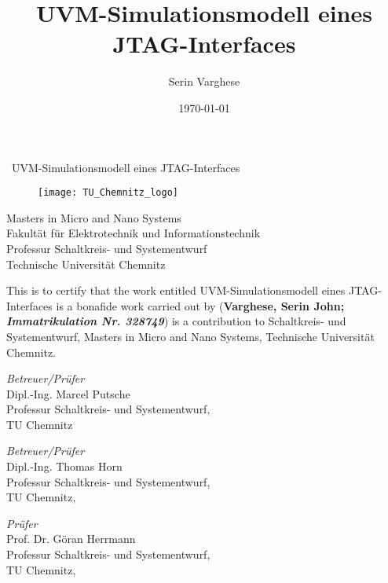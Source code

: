 \documentclass[a4paper,11pt]{article}
\title{\Huge{UVM-Simulationsmodell eines JTAG-Interfaces}}
\date{\today}
\author{Serin Varghese}
\begin{document}
\maketitle
\pagebreak

\newlength{\toptafiddle} 
\newlength{\bottafiddle}
\setlength{\toptafiddle}{1in}
\setlength{\bottafiddle}{1in}
\vspace*{-0.5in}
\enlargethispage{\bottafiddle}
\thispagestyle{empty}

\graphicspath{{./images/}}

\begin{center}
\ UVM-Simulationsmodell eines JTAG-Interfaces \\
\vspace{0.2cm}

\begin{figure}[!h]
\centering
\texttt{[image: TU\_Chemnitz\_logo]}
\end{figure}

Masters in Micro and Nano Systems\\
Fakultät für Elektrotechnik und Informationstechnik\\
Professur Schaltkreis- und Systementwurf\\
Technische Universität Chemnitz\\
\end{center}

This is to certify that the work entitled \textgravedbl UVM-Simulationsmodell eines JTAG-Interfaces \textacutedbl is a bonafide work carried out by 
(\textbf{Varghese, Serin John; \textit{Immatrikulation Nr. 328749}})
is a contribution to Schaltkreis- und Systementwurf, Masters in Micro and Nano
Systems, Technische Universität Chemnitz.

\vfill
\begin{minipage}[t]{0.3\textwidth}%
\emph{Betreuer/Prüfer}\\
Dipl.-Ing. Marcel Putsche\\
Professur Schaltkreis- und Systementwurf,\\
TU Chemnitz
\end{minipage}\hspace{0.1cm}
\begin{minipage}[t]{0.3\textwidth}%
\emph{Betreuer/Prüfer}\\
Dipl.-Ing. Thomas Horn\\
Professur Schaltkreis- und Systementwurf,\\
TU Chemnitz, \\
\end{minipage}\hspace{0.1cm}
\begin{minipage}[t]{0.3\textwidth}%
\emph{Prüfer}\\
Prof. Dr. Göran Herrmann\\
Professur Schaltkreis- und Systementwurf,\\
TU Chemnitz, \\
\end{minipage}\vfill
\vfill
\end{document}
